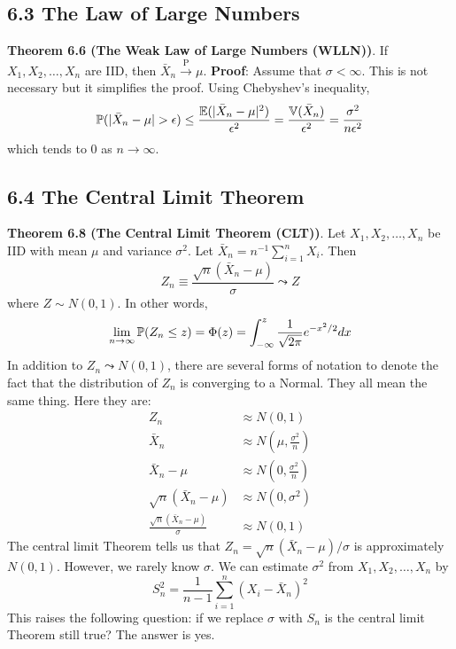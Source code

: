\subsection*{6.3 The Law of Large
Numbers}\label{the-law-of-large-numbers}

\textbf{Theorem 6.6 (The Weak Law of Large Numbers (WLLN))}. If
\(X_{1}, X_{2}, \dots, X_{n}\) are IID, then
\(\bar{X}_{n} \xrightarrow{\textrm{P}} \mu\).
\textbf{Proof}: Assume that \(\sigma < \infty\). This is not necessary
but it simplifies the proof. Using Chebyshev's inequality,
\[
\operatorname{\mathbb{P}}(|\bar{X}_{n} - \mu| > \epsilon) \leq \frac{\operatorname{\mathbb{E}}(|\bar{X}_{n} - \mu|^{2})}{\epsilon^{2}} = \frac{\operatorname{\mathbb{V}}(\bar{X}_{n})}{\epsilon^{2}} = \frac{\sigma^{2}}{n \epsilon^{2}}
\]
which tends to 0 as \(n \rightarrow \infty\).

\subsection*{6.4 The Central Limit
Theorem}\label{the-central-limit-theorem}

\textbf{Theorem 6.8 (The Central Limit Theorem (CLT))}. Let
\(X_{1}, X_{2}, \dots, X_{n}\) be IID with mean \(\mu\) and variance
\(\sigma^{2}\). Let \(\bar{X}_{n} = n^{-1}\sum_{i=1}^{n} X_{i}\). Then
\[
Z_{n} \equiv \frac{\sqrt{n} \left( \bar{X}_{n} - \mu \right)}{\sigma} \leadsto Z
\]
where \(Z \sim N(0, 1)\). In other words,
\[
\lim _{n \rightarrow \infty} \operatorname{\mathbb{P}}(Z_{n} \leq z) = \Phi(z) = \int _{-\infty} ^z \frac{1}{\sqrt{2 \pi}} e^{-x^{2}/2}dx
\]
In addition to \(Z_{n} \leadsto N(0, 1)\), there are several forms of
notation to denote the fact that the distribution of \(Z_{n}\) is
converging to a Normal. They all mean the same thing. Here they are:
\begin{align*}
Z_{n}                                           & \approx N(0, 1) \\
\bar{X}_{n}                                & \approx N\left( \mu, \frac{\sigma^{2}}{n} \right)  \\
\bar{X}_{n} - \mu                          & \approx N\left( 0,   \frac{\sigma^{2}}{n} \right)  \\
\sqrt{n}(\bar{X}_{n} - \mu)                & \approx N\left( 0, \sigma^{2} \right)              \\
\frac{\sqrt{n}(\bar{X}_{n} - \mu)}{\sigma} & \approx N(0, 1)
\end{align*}
The central limit Theorem tells us that
\(Z_{n} = \sqrt{n}(\bar{X}_{n} - \mu)/\sigma\) is approximately
\(N(0, 1)\). However, we rarely know \(\sigma\). We can estimate
\(\sigma^{2}\) from \(X_{1}, X_{2}, \dots, X_{n}\) by
\[
S_{n}^{2} = \frac{1}{n - 1} \sum_{i=1}^{n} ( X_{i} - \bar{X}_{n} )^{2}
\]
This raises the following question: if we replace \(\sigma\) with
\(S_{n}\) is the central limit Theorem still true? The answer is yes.


